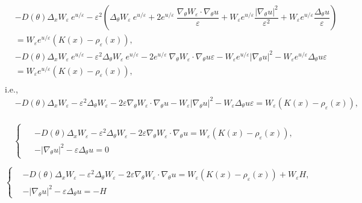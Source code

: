 \documentclass[preprint]{elsarticle}
\numberwithin{equation}{section}
\begin{document}
\begin{equation}
\begin{aligned}
&-D(\theta)\Delta_x W_\varepsilon ~e^{u/\varepsilon} -\varepsilon^2\left(\Delta_\theta W_\varepsilon ~e^{u/\varepsilon} + 2e^{u/\varepsilon}~\dfrac{\nabla_\theta W_\varepsilon\cdot \nabla_\theta u}{\varepsilon} + W_\varepsilon e^{u/\varepsilon}\dfrac{|\nabla_\theta u|^2}{\varepsilon^2} + W_\varepsilon e^{u/\varepsilon}\dfrac{\Delta_\theta u}{\varepsilon}\right)\\
&= W_\varepsilon e^{u/\varepsilon}(K(x)-\rho_\varepsilon(x)),\\
&-D(\theta)\Delta_x W_\varepsilon ~e^{u/\varepsilon} -\varepsilon^2\Delta_\theta W_\varepsilon ~e^{u/\varepsilon} - 2e^{u/\varepsilon}~\nabla_\theta W_\varepsilon\cdot \nabla_\theta u\varepsilon - W_\varepsilon e^{u/\varepsilon}|\nabla_\theta u|^2 - W_\varepsilon e^{u/\varepsilon}\Delta_\theta u\varepsilon\\
&= W_\varepsilon e^{u/\varepsilon}(K(x)-\rho_\varepsilon(x)),\\
\end{aligned}
\end{equation}
i.e.,
\begin{equation}
\begin{aligned}
&-D(\theta)\Delta_x W_\varepsilon -\varepsilon^2\Delta_\theta W_\varepsilon - 2\varepsilon\nabla_\theta W_\varepsilon\cdot \nabla_\theta u - W_\varepsilon |\nabla_\theta u|^2 - W_\varepsilon \Delta_\theta u\varepsilon= W_\varepsilon (K(x)-\rho_\varepsilon(x)),\\
\end{aligned}
\end{equation}

\begin{equation}
\begin{cases}
\begin{aligned}
&-D(\theta)\Delta_x W_\varepsilon -\varepsilon^2\Delta_\theta W_\varepsilon - 2\varepsilon\nabla_\theta W_\varepsilon\cdot \nabla_\theta u = W_\varepsilon (K(x)-\rho_\varepsilon(x)),\\
& - |\nabla_\theta u|^2 - \varepsilon \Delta_\theta u=0
\end{aligned}
\end{cases}
\end{equation}

\begin{equation}
\left\{
\begin{aligned}
&-D(\theta)\Delta_x W_\varepsilon -\varepsilon^2\Delta_\theta W_\varepsilon - 2\varepsilon\nabla_\theta W_\varepsilon\cdot \nabla_\theta u = W_\varepsilon (K(x)-\rho_\varepsilon(x)) + W_\varepsilon H,\\
& - |\nabla_\theta u|^2 - \varepsilon \Delta_\theta u= -H
\end{aligned}
\right.
\end{equation}
\end{document}
